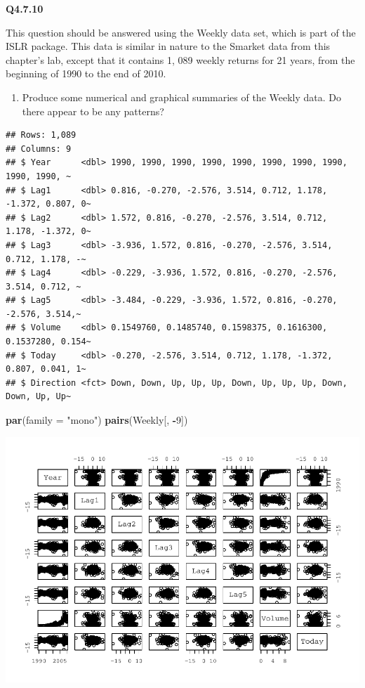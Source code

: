 \documentclass[
]{article}
\newenvironment{Shaded}{\begin{snugshade}}{\end{snugshade}}
\newcommand{\AttributeTok}[1]{\textcolor[rgb]{0.13,0.29,0.53}{#1}}
\newcommand{\DecValTok}[1]{\textcolor[rgb]{0.00,0.00,0.81}{#1}}
\newcommand{\FunctionTok}[1]{\textcolor[rgb]{0.13,0.29,0.53}{\textbf{#1}}}
\newcommand{\NormalTok}[1]{#1}
\newcommand{\SpecialCharTok}[1]{\textcolor[rgb]{0.81,0.36,0.00}{\textbf{#1}}}
\newcommand{\StringTok}[1]{\textcolor[rgb]{0.31,0.60,0.02}{#1}}
\providecommand{\tightlist}{%
  \setlength{\itemsep}{0pt}\setlength{\parskip}{0pt}}
\begin{document}
\textbf{Q4.7.10}

This question should be answered using the Weekly data set, which is
part of the ISLR package. This data is similar in nature to the Smarket
data from this chapter's lab, except that it contains 1, 089 weekly
returns for 21 years, from the beginning of 1990 to the end of 2010.

\begin{enumerate}
\def\labelenumi{(\alph{enumi})}
\tightlist
\item
  Produce some numerical and graphical summaries of the Weekly data. Do
  there appear to be any patterns?
\end{enumerate}

\begin{verbatim}
## Rows: 1,089
## Columns: 9
## $ Year      <dbl> 1990, 1990, 1990, 1990, 1990, 1990, 1990, 1990, 1990, 1990, ~
## $ Lag1      <dbl> 0.816, -0.270, -2.576, 3.514, 0.712, 1.178, -1.372, 0.807, 0~
## $ Lag2      <dbl> 1.572, 0.816, -0.270, -2.576, 3.514, 0.712, 1.178, -1.372, 0~
## $ Lag3      <dbl> -3.936, 1.572, 0.816, -0.270, -2.576, 3.514, 0.712, 1.178, -~
## $ Lag4      <dbl> -0.229, -3.936, 1.572, 0.816, -0.270, -2.576, 3.514, 0.712, ~
## $ Lag5      <dbl> -3.484, -0.229, -3.936, 1.572, 0.816, -0.270, -2.576, 3.514,~
## $ Volume    <dbl> 0.1549760, 0.1485740, 0.1598375, 0.1616300, 0.1537280, 0.154~
## $ Today     <dbl> -0.270, -2.576, 3.514, 0.712, 1.178, -1.372, 0.807, 0.041, 1~
## $ Direction <fct> Down, Down, Up, Up, Up, Down, Up, Up, Up, Down, Down, Up, Up~
\end{verbatim}

\begin{Shaded}
\begin{Highlighting}[]
\FunctionTok{par}\NormalTok{(}\AttributeTok{family =} \StringTok{"mono"}\NormalTok{)}
\FunctionTok{pairs}\NormalTok{(Weekly[, }\SpecialCharTok{{-}}\DecValTok{9}\NormalTok{])}
\end{Highlighting}
\end{Shaded}

\includegraphics{ISLR4.7.10_files/figure-latex/unnamed-chunk-3-1.pdf}
\end{document}
